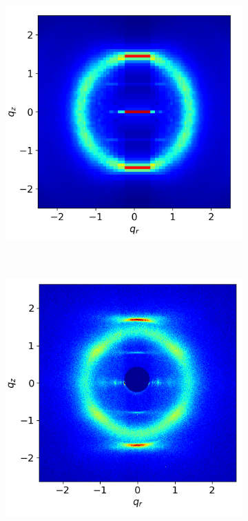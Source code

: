 \documentclass[journal=jpcbfk,manusciprt=article]{achemso}
\begin{document}
  \begin{figure}
  \begin{subfigure}{0.3\linewidth}
        \centering
        \vspace{-0.2em}
        \includegraphics[width=1.018\linewidth]{offset_rzplot.png}
        \caption{}~\label{fig:rz_offset}
  \end{subfigure}
  \begin{subfigure}{0.3\linewidth}
        \centering
        \includegraphics[scale=0.29]{WAXS_raw.png}

\end{subfigure}
\end{figure}
\end{document}
